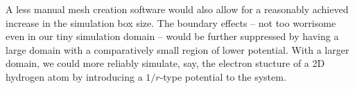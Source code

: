 \documentclass[a4paper,12pt]{article}
\begin{document}
A less manual mesh creation software would also allow for a reasonably achieved increase in the simulation box size. The boundary effects -- not too worrisome even in our tiny simulation domain -- would be further suppressed by having a large domain with a comparatively small region of lower potential. With a larger domain, we could more reliably simulate, say, the electron stucture of a 2D hydrogen atom by introducing a $1/r$-type potential to the system.

\printbibliography
\end{document}
